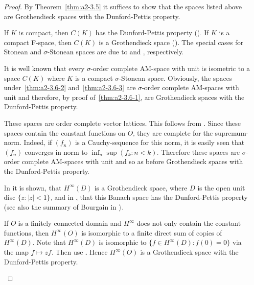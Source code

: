 \begin{proof}
By Theorem~\ref{thm:a2-3.5}   it suffices to show that the spaces listed above are Grothendieck spaces with the Dunford-Pettis property.
\begin{description}[style=standard, wide, labelindent=.25em]
		
\item[\ref{thm:a2-3.6-1}] 
	If\/ $K$ is compact, then $C(K)$ has the Dunford-Pettis property (\cf \textcite[Théorème 4]{grothendieck:1953}).
	If\/ $K$ is a compact F-space, then $C(K)$ is a Grothendieck space (\cf \textcite[Theorem 2.5]{seever:1968}). 
	The special cases for Stonean and $\sigma$-Stonean spaces are due to \textcite[Théorème 9]{grothendieck:1953} and \textcite{ando:1961},  respectively.
		
\item[\ref{thm:a2-3.6-2} and~\ref{thm:a2-3.6-3} ] It is well known that every $\sigma$-order complete AM-space with unit is isometric to a space $C(K)$ where $K$ is a compact $\sigma$-Stonean space.
Obviously, the spaces under~\ref{thm:a2-3.6-2}   and~\ref{thm:a2-3.6-3}  are $\sigma$-order complete AM-spaces with unit and therefore, by proof of~\ref{thm:a2-3.6-1}, are  Grothendieck spaces with the Dunford-Pettis property.
		
\item[\ref{thm:a2-3.6-4} and~\ref{thm:a2-3.6-5}] These spaces are order complete vector lattices.
This follows from \textcite[pp.18-22, Standardbeispiele 1 and 2 p.55]{bauer:1966}.
Since these spaces contain the constant functions on $O$, they are complete for the supremum-norm.
Indeed, if\/ $(f_n)$ is a Cauchy-sequence for this norm, it is easily seen that $(f_n)$ converges in norm to $\inf_n \sup(f_k \colon n < k)$.
Therefore these spaces are $\sigma$-order complete AM-spaces with unit and so as before Grothendieck spaces with the Dunford-Pettis property.
		
\item[\ref{thm:a2-3.6-6}] In \textcite{bourgain:1982} it is shown, that $H^{\infty}(D)$ is a Grothendieck space, where $D$ is the open unit disc $\{z \colon |z| < 1\}$, and in \textcite{bourgain:1984}, that this Banach space has the Dunford-Pettis property (see also the summary of Bourgain in \textcite{blei:1983}).
		
If\/ $O$ is a finitely connected domain and $H^{\infty}$ does not only contain the constant functions, then $H^{\infty}(O)$ is isomorphic to a finite direct sum of copies of\/ $H^{\infty}(D)$.
Note that $H^{\infty}(D)$ is isomorphic to $\{f \in H^{\infty}(D) \colon f(0) = 0\}$ via the map $f \mapsto zf$.
Then use \textcite[p.77 and Proposition 4.4.1]{grothendieck:1953}.
Hence $H^{\infty}(O)$ is a Grothendieck space with the Dunford-Pettis property.
\qedhere
\end{description}
\end{proof}
